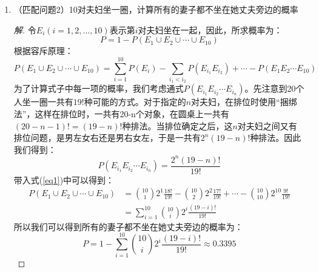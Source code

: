\documentclass[12pt]{article}
\newcommand{\hei}{\CJKfamily{hei}}                          %
\begin{document}
\begin{enumerate}
\item {\hei （匹配问题2）10对夫妇坐一圈，计算所有的妻子都不坐在她丈夫旁边的概率}
\begin{proof}[解]
	令$E_i(i=1,2,...,10)$表示第$i$对夫妇坐在一起，因此，所求概率为：
	\begin{equation}
	P=1-P(E_1\cup E_2\cup \cdots \cup E_{10})
	\end{equation}
	根据容斥原理：
	\begin{equation}
	\label{eq1}
	P(E_1\cup E_2\cup \cdots \cup E_{10})=\sum_{i=1}^{10}P(E_i)-\sum_{i_1<i_2}P(E_{i_1}E_{i_2})+\cdots-P(E_1E_2\cdots E_{10})
	\end{equation}
	为了计算式子中每一项的概率，我们考虑通式$P(E_{i_1}E_{i_2}\cdots E_{i_n})$。先注意到20个人坐一圈一共有$19!$种可能的方式。对于指定的$n$对夫妇，在排位时使用“捆绑法”，这样在排位时，一共有20-n个对象，在圆桌上一共有$(20-n-1)!=(19-n)!$种排法。当排位确定之后，这$n$对夫妇之间又有排位问题，是男左女右还是男右女左，于是一共有$2^n(19-n)!$种排法。因此我们得到：
	\begin{equation}
	P(E_{i_1}E_{i_2}\cdots E_{i_n})=\frac{2^n(19-n)!}{19!}
	\end{equation}
	带入式(\ref{eq1})中可以得到：
	\begin{equation}
	\begin{aligned}
	P(E_1\cup E_2\cup \cdots \cup E_{10})&=\binom{10}{1}2^1\frac{18!}{19!}-\binom{10}{2}2^2\frac{17!}{19!}+\cdots-\binom{10}{10}2^{10}\frac{9!}{19!} \\
	&=\sum_{i=1}^{10}\binom{10}{i}2^i\frac{(19-i)!}{19!}
	\end{aligned}
	\end{equation}
	所以我们可以得到所有的妻子都不坐在她丈夫旁边的概率为：
	\begin{equation}
	P=1-\sum_{i=1}^{10}\binom{10}{i}2^i\frac{(19-i)!}{19!}\approx 0.3395
	\end{equation}
\end{proof}


\end{enumerate}
\end{document}
